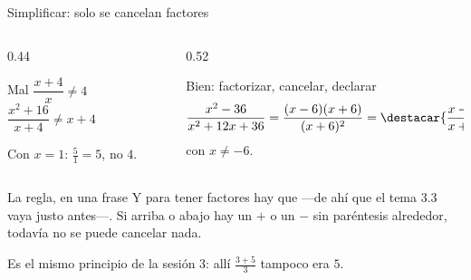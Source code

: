 \documentclass[aspectratio=169,10pt]{beamer}
\begin{document}
\begin{frame}{Simplificar: solo se cancelan factores}
  \scriptsize
  \begin{columns}[T,onlytextwidth]
    \begin{column}{0.44\textwidth}
      \begin{alertblock}{Mal}
        \tiny
        $\dfrac{x+4}{x} \neq 4$ \qquad
        $\dfrac{x^{2}+16}{x+4} \neq x+4$

        \vspace{0.06cm}
         Con $x=1$:
        $\tfrac{5}{1}=5$, no $4$.
      \end{alertblock}
    \end{column}
    \begin{column}{0.52\textwidth}
      \begin{exampleblock}{Bien: factorizar, cancelar, declarar}
        \tiny
        \[ \frac{x^{2}-36}{x^{2}+12x+36}
         = \frac{(x-6)(x+6)}{(x+6)^{2}}
         = \destacar{\frac{x-6}{x+6}} \]
        con $x\neq -6$.
      \end{exampleblock}
    \end{column}
  \end{columns}

  \vspace{0.12cm}
  \begin{block}{La regla, en una frase}
    \tiny
     Y para
    tener factores hay que  —de ahí que el tema 3.3
    vaya justo antes—. Si arriba o abajo hay un $+$ o un $-$ sin paréntesis
    alrededor, todavía no se puede cancelar nada.
  \end{block}

  \vspace{0.06cm}
  {\tiny\color{uniGris} Es el mismo principio de la sesión 3: allí
  $\tfrac{3+5}{3}$ tampoco era $5$. }
\end{frame}
\end{document}
